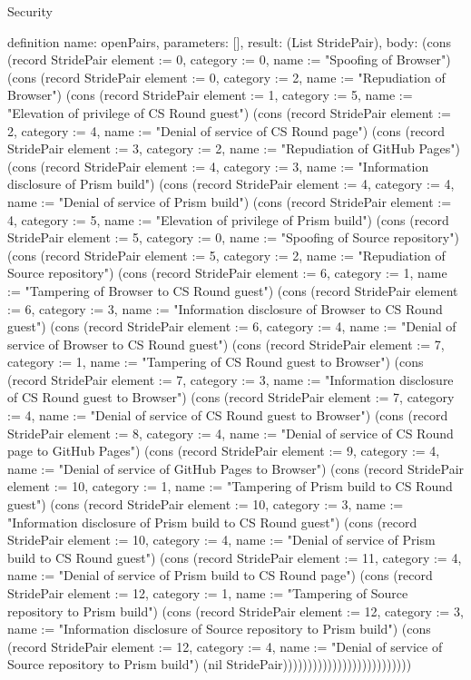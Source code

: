 \begin{lexlean}{Security}
\begin{semanticmodule}
definition{
  name: openPairs,
  parameters: [],
  result: (List StridePair),
  body: (cons (record StridePair {element := 0, category := 0, name := "Spoofing of Browser"}) (cons (record StridePair {element := 0, category := 2, name := "Repudiation of Browser"}) (cons (record StridePair {element := 1, category := 5, name := "Elevation of privilege of CS Round guest"}) (cons (record StridePair {element := 2, category := 4, name := "Denial of service of CS Round page"}) (cons (record StridePair {element := 3, category := 2, name := "Repudiation of GitHub Pages"}) (cons (record StridePair {element := 4, category := 3, name := "Information disclosure of Prism build"}) (cons (record StridePair {element := 4, category := 4, name := "Denial of service of Prism build"}) (cons (record StridePair {element := 4, category := 5, name := "Elevation of privilege of Prism build"}) (cons (record StridePair {element := 5, category := 0, name := "Spoofing of Source repository"}) (cons (record StridePair {element := 5, category := 2, name := "Repudiation of Source repository"}) (cons (record StridePair {element := 6, category := 1, name := "Tampering of Browser to CS Round guest"}) (cons (record StridePair {element := 6, category := 3, name := "Information disclosure of Browser to CS Round guest"}) (cons (record StridePair {element := 6, category := 4, name := "Denial of service of Browser to CS Round guest"}) (cons (record StridePair {element := 7, category := 1, name := "Tampering of CS Round guest to Browser"}) (cons (record StridePair {element := 7, category := 3, name := "Information disclosure of CS Round guest to Browser"}) (cons (record StridePair {element := 7, category := 4, name := "Denial of service of CS Round guest to Browser"}) (cons (record StridePair {element := 8, category := 4, name := "Denial of service of CS Round page to GitHub Pages"}) (cons (record StridePair {element := 9, category := 4, name := "Denial of service of GitHub Pages to Browser"}) (cons (record StridePair {element := 10, category := 1, name := "Tampering of Prism build to CS Round guest"}) (cons (record StridePair {element := 10, category := 3, name := "Information disclosure of Prism build to CS Round guest"}) (cons (record StridePair {element := 10, category := 4, name := "Denial of service of Prism build to CS Round guest"}) (cons (record StridePair {element := 11, category := 4, name := "Denial of service of Prism build to CS Round page"}) (cons (record StridePair {element := 12, category := 1, name := "Tampering of Source repository to Prism build"}) (cons (record StridePair {element := 12, category := 3, name := "Information disclosure of Source repository to Prism build"}) (cons (record StridePair {element := 12, category := 4, name := "Denial of service of Source repository to Prism build"}) (nil StridePair))))))))))))))))))))))))))
}


\end{semanticmodule}
\end{lexlean}
